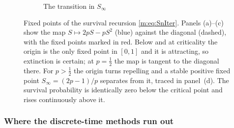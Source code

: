 \begin{figure}[htbp]
    \vspace{10pt}
    \begin{subfigure}[b]{0.55\textwidth}
    \centering
    \caption{The transition in $S_\infty$}
    \end{subfigure}

    \caption{Fixed points of the survival recursion \cref{m:eq:SnIter}. Panels
    (a)--(c) show the map $S\mapsto 2pS-pS^2$ (blue) against the diagonal (dashed),
    with the fixed points marked in red. Below and at criticality the origin is the
    only fixed point in $[0,1]$ and it is attracting, so extinction is certain; at
    $p=\tfrac12$ the map is tangent to the diagonal there. For $p>\tfrac12$ the
    origin turns repelling and a stable positive fixed point $S_\infty=(2p-1)/p$
    separates from it, traced in panel~(d). The survival probability is identically
    zero below the critical point and rises continuously above it.}
    \label{m:fig:phase_transition}
\end{figure}

\subsubsection{Where the discrete-time methods run out}
\label{m:sec:dtlimit}

